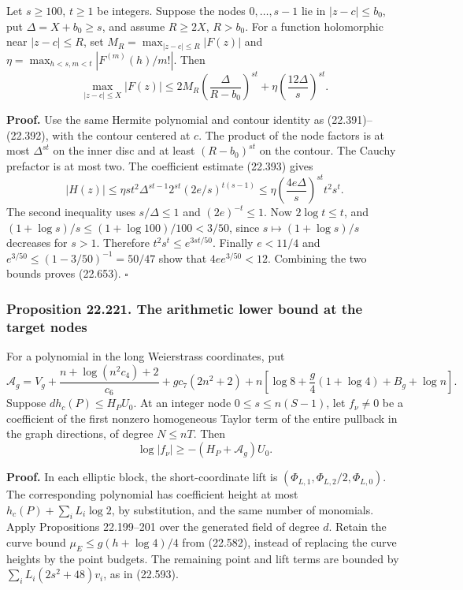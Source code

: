 \documentclass[
  11pt,
  a4paper,
]{article}
\begin{document}
Let \(s\ge100\), \(t\ge1\) be integers. Suppose the nodes
\(0,\ldots,s-1\) lie in \(|z-c|\le b_0\), put \(\Delta=X+b_0\ge s\), and
assume \(R\ge2X\), \(R>b_0\). For a function holomorphic near
\(|z-c|\le R\), set \(M_R=\max_{|z-c|\le R}|F(z)|\) and
\(\eta=\max_{h<s,m<t}|F^{(m)}(h)/m!|\). Then \[
 \max_{|z-c|\le X}|F(z)|
 \le2M_R\left(\frac{\Delta}{R-b_0}\right)^{st}
       +\eta\left(\frac{12\Delta}{s}\right)^{st}.
 \tag{22.653}
\]

\textbf{Proof.} Use the same Hermite polynomial and contour identity as
(22.391)--(22.392), with the contour centered at \(c\). The product of
the node factors is at most \(\Delta^{st}\) on the inner disc and at
least \((R-b_0)^{st}\) on the contour. The Cauchy prefactor is at most
two. The coefficient estimate (22.393) gives \[
 |H(z)|\le
 \eta s t^2\Delta^{st-1}2^{st}(2e/s)^{t(s-1)}
 \le\eta\left(\frac{4e\Delta}{s}\right)^{st}
                   t^2s^t.
 \tag{22.654}
\] The second inequality uses \(s/\Delta\le1\) and \((2e)^{-t}\le1\).
Now \(2\log t\le t\), and \((1+\log s)/s\le(1+\log100)/100<3/50\), since
\(s\mapsto(1+\log s)/s\) decreases for \(s>1\). Therefore
\(t^2s^t\le e^{3st/50}\). Finally \(e<11/4\) and
\(e^{3/50}\le(1-3/50)^{-1}=50/47\) show that \(4e e^{3/50}<12\).
Combining the two bounds proves (22.653). \(\square\)

\subsubsection{Proposition 22.221. The arithmetic lower bound at the
target
nodes}\label{proposition-22.221.-the-arithmetic-lower-bound-at-the-target-nodes}

For a polynomial in the long Weierstrass coordinates, put \[
 \mathcal A_g=V_g+
 \frac{n+\log(n^2c_4)+2}{c_6}
 +g c_7(2n^2+2)
 +n\left[\log8+\frac g4(1+\log4)+B_g+\log n\right].
 \tag{22.655}
\] Suppose \(d h_c(P)\le H_PU_0\). At an integer node
\(0\le s\le n(S-1)\), let \(f_\nu\ne0\) be a coefficient of the first
nonzero homogeneous Taylor term of the entire pullback in the graph
directions, of degree \(N\le nT\). Then \[
 \log|f_\nu|\ge-(H_P+\mathcal A_g)U_0.
 \tag{22.656}
\]

\textbf{Proof.} In each elliptic block, the short-coordinate lift is
\((\Phi_{L,1},\Phi_{L,2}/2,\Phi_{L,0})\). The corresponding polynomial
has coefficient height at most \(h_c(P)+\sum_iL_i\log2\), by
substitution, and the same number of monomials. Apply Propositions
22.199--201 over the generated field of degree \(d\). Retain the curve
bound \(\mu_E\le g(h+\log4)/4\) from (22.582), instead of replacing the
curve heights by the point budgets. The remaining point and lift terms
are bounded by \(\sum_iL_i(2s^2+48)v_i\), as in (22.593).
\end{document}
